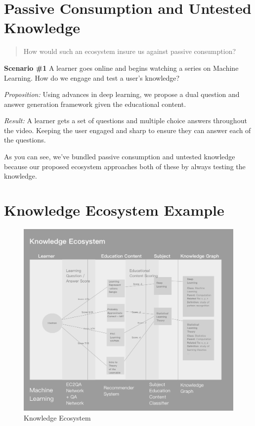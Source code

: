 \documentclass[]{book}
\theoremstyle{definition}
\theoremstyle{definition}
\theoremstyle{definition}
\theoremstyle{remark}
\begin{document}
\section{Passive Consumption and Untested
Knowledge}\label{passive-consumption-and-untested-knowledge}

\begin{quote}
How would such an ecosystem insure us against passive consumption?
\end{quote}

\textbf{Scenario \#1} A learner goes online and begins watching a series
on Machine Learning. How do we engage and test a user's knowledge?

\emph{Proposition:} Using advances in deep learning, we propose a dual
question and answer generation framework given the educational content.

\emph{Result:} A learner gets a set of questions and multiple choice
answers throughout the video. Keeping the user engaged and sharp to
ensure they can answer each of the questions.

As you can see, we've bundled passive consumption and untested knowledge
because our proposed ecosystem approaches both of these by always
testing the knowledge.

\section{Knowledge Ecosystem Example}\label{knowledge-ecosystem-example}

\begin{figure}
\centering
\includegraphics{img/knowledgeEcosystem.png}
\caption{Knowledge Ecosystem}
\end{figure}
\end{document}
